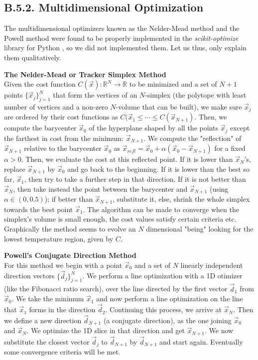 \documentclass[11pt, a4paper, twoside]{article} %
\newcommand{\R}{\mathbb{R}} %
\DeclareRobustCommand{\mybox}[2][gray!10]{%
\begin{tcolorbox}[   %
        left=0.2cm,
        right=0.2cm,
        top=0.15cm,
        bottom=0.15cm,
        colback=#1,
        colframe=#1,
        width=\dimexpr\textwidth\relax, 
        enlarge left by=0mm,
        boxsep=5pt,
        arc=0pt,outer arc=0pt,
        ]
        #2
\end{tcolorbox}
}
\begin{document}
\subsection*{B.5.2. Multidimensional Optimization\vspace{-0.2cm}}
The multidimensional optimizers known as the Nelder-Mead method and the Powell method were found to be properly implemented in the {\em scikit-optimize} library for Python \cite{skopt}, so we did not implemented them. Let us thus, only explain them qualitatively.
\mybox{{\bf The Nelder-Mead or Tracker Simplex Method \cite{NM,opt}\vspace{0.2cm}}\\
Given the cost function $C(\vec{x}):\R^N\rightarrow\R$ to be minimized and a set of $N+1$ points $\{\vec{x}_j\}_{j=1}^N$ that form the vertices of an $N$-simplex (the polytope with least number of vertices and a non-zero $N$-volume that can be built), we make sure $\vec{x}_j$ are ordered by their cost functions as $C(\vec{x}_1\leq\cdots\leq C(\vec{x}_{N+1})$. Then, we compute the barycenter $\vec{x}_0$ of the hyperplane shaped by all the points $\vec{x}_j$ except the farthest in cost from the minimum: $\vec{x}_{N+1}$. We compute the "reflection" of $\vec{x}_{N+1}$ relative to the barycenter $\vec{x}_0$ as $\vec{x}_{refl}=\vec{x}_0+\alpha(\vec{x}_0-\vec{x}_{N+1})$ for a fixed $\alpha>0$. Then, we evaluate the cost at this reflected point. If it is lower than $\vec{x}_N$'s, replace $\vec{x}_{N+1}$ by $\vec{x}_0$ and go back to the beginning. If it is lower than the best so far, $\vec{x}_1$, then try to take a further step in that direction. If it is not better than $\vec{x}_N$, then take instead the point between the barycenter and $\vec{x}_{N+1}$ (using $\alpha\in(0,0.5)$); if better than $\vec{x}_{N+1}$, substitute it, else, shrink the whole simplex towards the best point $\vec{x}_1$. The algorithm can be made to converge when the simplex's volume is small enough, the cost values satisfy certain criteria etc. Graphically the method seems to evolve an $N$ dimensional "being" looking for the lowest temperature region, given by $C$.\vspace*{0.3cm}

{\bf Powell's Conjugate Direction Method \cite{P,opt} \vspace{0.2cm}\\}
For this method we begin with a point $\vec{x}_0$ and a set of $N$ linearly independent direction vectors $\{\vec{d}_j\}_{j=1}^N$. We perform a line optimization with a 1D otimizer (like the Fibonacci ratio search), over the line directed by the first vector $\vec{d}_1$ from $\vec{x}_0$. We take the minimum $\vec{x}_1$ and now perform a line optimization on the line that $\vec{x}_1$ forms in the direction $\vec{d}_2$. Continuing this process, we arrive at $\vec{x}_N$. Then we define a new direction $\vec{d}_{N+1}$ (a conjugate direction), as the one joining $\vec{x}_0$ and $\vec{x}_N$. We optimize the 1D slice in that direction and get $\vec{x}_{N+1}$. We now substitute the closest vector $\vec{d}_j$ to $\vec{d}_{N+1}$ by $\vec{d}_{N+1}$ and start again. Eventually some convergence criteria will be met.
}\vspace{-0.4cm}
\end{document}
